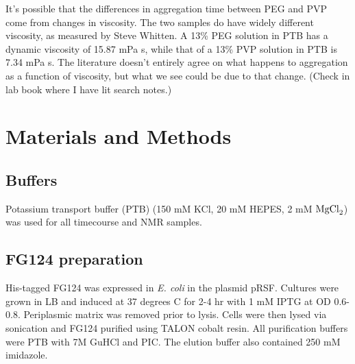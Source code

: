 It's possible that the differences in aggregation time between PEG and PVP come from changes in viscosity.  The two samples do have widely different viscosity, as measured by Steve Whitten.  A 13\% PEG solution in PTB has a dynamic viscosity of 15.87 mPa s, while that of a 13\% PVP solution in PTB is 7.34 mPa s.  The literature doesn't entirely agree on what happens to aggregation as a function of viscosity, but what we see could be due to that change.  (Check in lab book where I have lit search notes.)

\section{Materials and Methods}
\subsection{Buffers} Potassium transport buffer (PTB) (150 mM KCl, 20 mM HEPES, 2 mM $\mathrm{MgCl}_2$) was used for all timecourse and NMR samples.
\subsection{FG124 preparation} His-tagged FG124 was expressed in \emph{E. coli} in the plasmid pRSF.  Cultures were grown in LB and  induced at 37 degrees C for 2-4 hr with 1 mM IPTG at OD 0.6-0.8.  Periplasmic matrix was removed prior to lysis.  Cells were then lysed via sonication and FG124 purified using TALON cobalt resin.  All purification buffers were PTB with 7M GuHCl and PIC.  The elution buffer also contained 250 mM imidazole.
